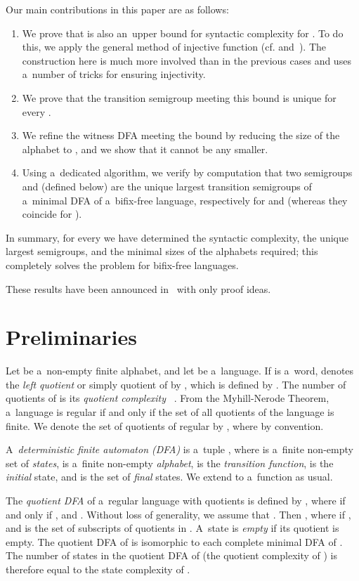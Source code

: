\documentclass{amsart}
\begin{document}
Our main contributions in this paper are as follows:
\begin{enumerate}
\item We prove that  is also an~upper bound for syntactic complexity for .
To do this, we apply the general method of injective function (cf. \cite{BrSz14a} and~\cite{BrSz15SyntacticComplexityOfSuffixFree}).
The construction here is much more involved than in the previous cases and uses a~number of tricks for ensuring injectivity.
\item We prove that the transition semigroup meeting this bound is unique for every .
\item We refine the witness DFA meeting the bound by reducing the size of the alphabet to , and we show that it cannot be any smaller.
\item Using a~dedicated algorithm, we verify by computation that two semigroups  and  (defined below) are the unique largest transition semigroups of a~minimal DFA of a~bifix-free language, respectively for  and  (whereas they coincide for ).
\end{enumerate}
In summary, for every  we have determined the syntactic complexity, the unique largest semigroups, and the minimal sizes of the alphabets required; this completely solves the problem for bifix-free languages.

These results have been announced in~\cite{SzWi17SyntacticComplexityOfBifixFree} with only proof ideas.


\section{Preliminaries}

Let  be a~non-empty finite alphabet, and let  be a~language.
If  is a~word,  denotes the \emph{left quotient} or simply quotient of  by , which is defined by .
The number of quotients of  is its \emph{quotient complexity}~\cite{Brz10} . 
From the Myhill-Nerode Theorem, a~language is regular if and only if the set of all quotients of the language is finite.
We denote the set of quotients of regular  by , where  by convention.

A~\emph{deterministic finite automaton (DFA)} is a~tuple , where  is a~finite non-empty set of \emph{states},  is a~finite non-empty \emph{alphabet},  is the \emph{transition function},  is the \emph{initial} state, and  is the set of \emph{final} states.
We extend  to a~function  as usual.

The \emph{quotient DFA} of a~regular language  with  quotients is defined by
, where  if and only if , and .
Without loss of generality, we assume that .
Then , where  if , and  is the set of subscripts of quotients in .
A~state  is \emph{empty} if its quotient  is empty.
The quotient DFA of  is isomorphic to each complete minimal DFA of .
The number of states in the quotient DFA of  (the quotient complexity of ) is therefore equal to the state complexity of .
\end{document}
